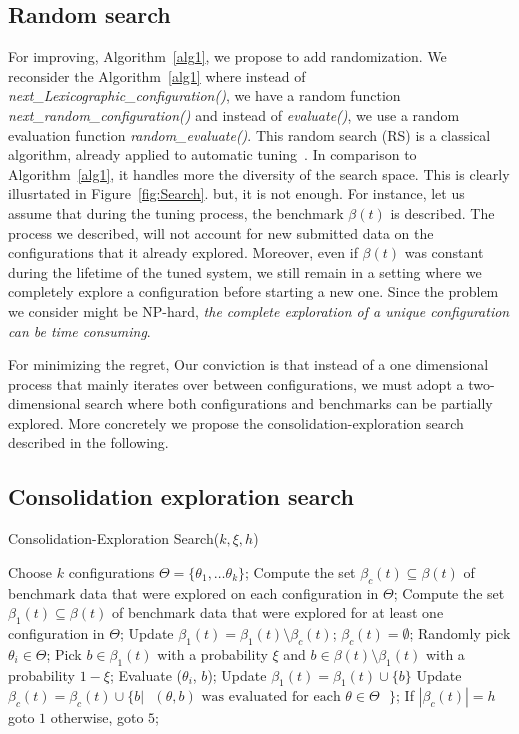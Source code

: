 \documentclass[10pt, conference, compsocconf]{IEEEtran}
\begin{document}
\subsection{Random search}

For improving, Algorithm~\ref{alg1}, we propose to add randomization. We reconsider the Algorithm~\ref{alg1} 
where instead of {\it next\_Lexicographic\_configuration()}, we have a random function {\it next\_random\_configuration()}
and instead of {\it evaluate()}, we use a random evaluation function {\it random\_evaluate()}. 
This random search (RS) is a classical algorithm, already applied to automatic tuning~\cite{Hutter:2009:PAA:1734953.1734959}. 
In comparison to Algorithm~\ref{alg1}, it handles more the 
diversity of the search space.  This is clearly illusrtated in Figure~\ref{fig:Search}. but, it is not enough. 
For instance, let us assume that during the tuning process, the benchmark $\beta(t)$ is described. The process we described, 
will not account for new submitted data on the configurations that it already explored. Moreover, even if 
$\beta(t)$ was constant during the lifetime of the tuned system, we still remain in a setting where we completely explore 
a configuration before starting a new one. Since the problem we consider might be NP-hard, {\it the complete 
exploration of a unique configuration can be time consuming}.

For minimizing the regret, Our conviction is that instead of a one dimensional process that mainly iterates over 
between configurations, we must adopt a  two-dimensional search where both configurations and benchmarks can be partially 
explored. More concretely we propose the consolidation-exploration search described in the following.

\subsection{Consolidation exploration search}


	\begin{algorithm}                    
	\caption{\scriptsize Consolidation-Exploration Search($k, \xi, h$)} 	\label{alg3}  
	\begin{algorithmic}[1]
	\scriptsize
	\STATE Choose $k$ configurations $\Theta = \{\theta_1,\dots \theta_k\}$; 
	\STATE Compute the set $\beta_c(t) \subseteq \beta(t)$ of benchmark data that were explored on each 
configuration in $\Theta$; 
	\STATE Compute the set $\beta_1(t) \subseteq \beta(t)$ of benchmark data that were explored for at least one 
configuration in $\Theta$;
	\STATE Update $\beta_1(t) = \beta_1(t) \setminus \beta_c(t)$; $\beta_c(t) = \emptyset$;
	\STATE Randomly pick $\theta_i \in \Theta$; 
	\STATE Pick $b \in \beta_1(t)$ with a probability $\xi$ and $b \in \beta(t) \setminus \beta_1(t)$  with 
a probability $1-\xi$;
	\STATE Evaluate ($\theta_i$, $b$);
	\STATE Update $\beta_1(t) = \beta_1(t) \cup \{ b\} $ 
	\STATE Update $\beta_c(t) = \beta_c(t) \cup \{ b | \text{ $(\theta, b)$ was evaluated for each $\theta \in \Theta$ } \}$;
	\STATE If $|\beta_c(t)| = h$  goto $1$ otherwise, goto $5$;
	\end{algorithmic}
	\end{algorithm}
	\normalsize
\end{document}
